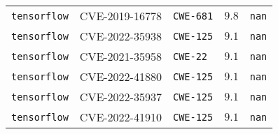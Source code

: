 \begin{table}
\begin{tabular}{lllll}
\texttt{tensorflow} & CVE-2019-16778 & \texttt{CWE-681} & $9.8$ & \texttt{nan} \\
\texttt{tensorflow} & CVE-2022-35938 & \texttt{CWE-125} & $9.1$ & \texttt{nan} \\
\texttt{tensorflow} & CVE-2021-35958 & \texttt{CWE-22} & $9.1$ & \texttt{nan} \\
\texttt{tensorflow} & CVE-2022-41880 & \texttt{CWE-125} & $9.1$ & \texttt{nan} \\
\texttt{tensorflow} & CVE-2022-35937 & \texttt{CWE-125} & $9.1$ & \texttt{nan} \\
\texttt{tensorflow} & CVE-2022-41910 & \texttt{CWE-125} & $9.1$ & \texttt{nan} \\
\bottomrule
\end{tabular}
\end{table}
